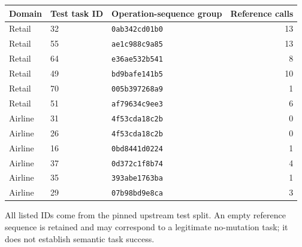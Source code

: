 \begin{center}
\begin{tabular}{lllr}
\toprule
Domain & Test task ID & Operation-sequence group & Reference calls\\
\midrule
Retail & 32 & \texttt{0ab342cd01b0} & 13\\
Retail & 55 & \texttt{ae1c988c9a85} & 13\\
Retail & 64 & \texttt{e36ae532b541} & 8\\
Retail & 49 & \texttt{bd9bafe141b5} & 10\\
Retail & 70 & \texttt{005b397268a9} & 1\\
Retail & 51 & \texttt{af79634c9ee3} & 6\\
Airline & 31 & \texttt{4f53cda18c2b} & 0\\
Airline & 26 & \texttt{4f53cda18c2b} & 0\\
Airline & 16 & \texttt{0bd8441d0224} & 1\\
Airline & 37 & \texttt{0d372c1f8b74} & 4\\
Airline & 35 & \texttt{393abe1763ba} & 1\\
Airline & 29 & \texttt{07b98bd9e8ca} & 3\\
\bottomrule
\end{tabular}
\end{center}
All listed IDs come from the pinned upstream test split. An empty reference sequence is retained and may correspond to a legitimate no-mutation task; it does not establish semantic task success.
